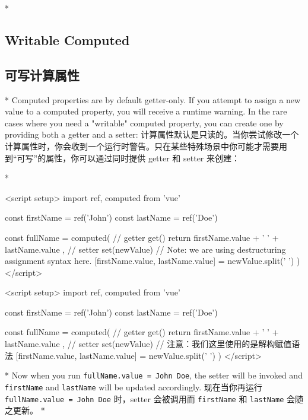 \begin{paracol}{2}
\switchcolumn[0]*%
\subsection{Writable Computed}
\switchcolumn
\subsection{可写计算属性}
\switchcolumn[0]*%
Computed properties are by default getter-only. If you attempt to assign
a new value to a computed property, you will receive a runtime warning.
In the rare cases where you need a "writable" computed property, you can
create one by providing both a getter and a setter:
\switchcolumn
计算属性默认是只读的。当你尝试修改一个计算属性时，你会收到一个运行时警告。只在某些特殊场景中你可能才需要用到``可写''的属性，你可以通过同时提供
getter 和 setter 来创建：

\switchcolumn[0]*%
\begin{codeHtml}
<script setup>
import { ref, computed } from 'vue'

const firstName = ref('John')
const lastName = ref('Doe')

const fullName = computed({
    // getter
    get() {
    return firstName.value + ' ' + lastName.value
    },
    // setter
    set(newValue) {
    // Note: we are using destructuring assignment syntax here.
    [firstName.value, lastName.value] = newValue.split(' ')
    }
})
</script>
\end{codeHtml}
\switchcolumn
\begin{codeHtml}
<script setup>
import { ref, computed } from 'vue'

const firstName = ref('John')
const lastName = ref('Doe')

const fullName = computed({
    // getter
    get() {
    return firstName.value + ' ' + lastName.value
    },
    // setter
    set(newValue) {
    // 注意：我们这里使用的是解构赋值语法
    [firstName.value, lastName.value] = newValue.split(' ')
    }
})
</script>
\end{codeHtml}

\switchcolumn[0]*%
Now when you run
\texttt{fullName.value\ =\ \textquotesingle{}John\ Doe\textquotesingle{}},
the setter will be invoked and \texttt{firstName} and \texttt{lastName}
will be updated accordingly.
\switchcolumn
现在当你再运行
\texttt{fullName.value\ =\ \textquotesingle{}John\ Doe\textquotesingle{}}
时，setter 会被调用而 \texttt{firstName} 和 \texttt{lastName}
会随之更新。
\switchcolumn[0]*%

\end{paracol}
